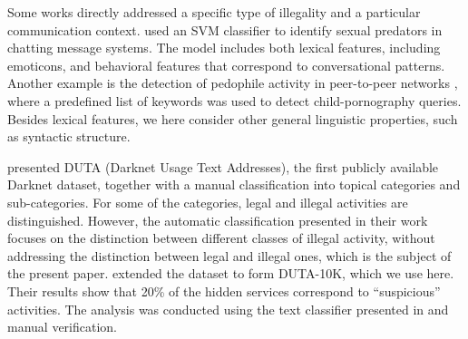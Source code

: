 \documentclass[11pt,a4paper,table]{article}
\newcommand{\oa}[1]{\footnote{\color{red}OA: #1}}
\begin{document}
Some works directly addressed a specific type of illegality and a particular communication context. \citet{MorrisHirst12} used an SVM classifier to identify sexual predators in chatting message systems. The model includes both lexical features, including emoticons, and behavioral features that correspond to conversational patterns. Another example is the detection of pedophile activity in peer-to-peer networks \citep{Latapy13}, where a predefined list of keywords was used to detect child-pornography queries. Besides lexical features, we here consider other general linguistic properties, such as syntactic structure.%

\citet{AlNabki17} presented DUTA (Darknet Usage Text Addresses), the first publicly available Darknet dataset, together with a manual classification into topical categories and sub-categories. For some of the categories, legal and illegal activities are distinguished. However, the automatic classification presented in their work focuses on the distinction between different classes of illegal activity, without addressing the distinction between legal and illegal ones, which is the subject of the present paper. \citet{AlNabki19} extended the dataset to form DUTA-10K, which we use here. Their results show that 20\% of the hidden services correspond to ``suspicious'' activities. The analysis was conducted using the text classifier presented in \citet{AlNabki17} and manual verification. %
\end{document}

